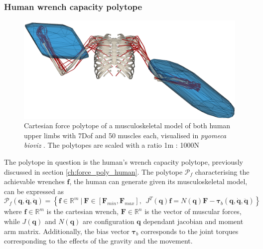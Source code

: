 \subsubsection{Human wrench capacity polytope}
\begin{figure}[!h]
    \centering
    \includegraphics[width=0.5\linewidth]{Papers/images/bimanual.png}
    \caption{Cartesian force polytope of a musculoskeletal model of both human upper limbs  \cite{saul2015benchmarking} with 7Dof and 50 muscles each, visualised in \textit{pyomeca bioviz} \cite{Michaud2021}. The polytopes are scaled with a ratio 1m : 1000N}
    \label{fig:images_bimanual}
\end{figure}
The polytope in question is the human's wrench capacity polytope, previously discussed in section \ref{ch:force_poly_human}. The polytope $\mathcal{P}_f$ characterising the achievable wrenches $\bm{f}$, the human can generate given its musculoskeletal model, can be expressed as 
\begin{equation}
    \mathcal{P}_f(\bm{q},\dot{\bm{q}},\ddot{\bm{q}}) = \left\{ \bm{f} \in \mathbb{R}^m ~|~ \bm{F}\in\left[\bm{F}_{min}, \bm{F}_{max} \right], ~~ \!J^T(\bm{q})\bm{f} =\! N(\bm{q})\bm{F} -\bm{\tau}_b(\bm{q},\dot{\bm{q}},\ddot{\bm{q}}) \right\}
    \label{eq:human_force_poly_revisit2}
\end{equation}
where $\bm{f}\in\mathbb{R}^m$ is the cartesian wrench, $\bm{F}\in\mathbb{R}^n$ is the vector of muscular forces, while $J(\bm{q})$ and $N(\bm{q})$ are configuration $\bm{q}$ dependant jacobian and moment arm matrix. Additionally, the bias vector $\bm{\tau}_b$ corresponds to the joint torques corresponding to the effects of the gravity and the movement. 

